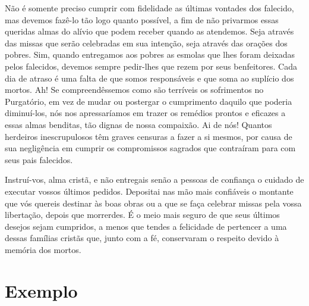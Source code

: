 Não é somente preciso cumprir com fidelidade as últimas vontades dos falecido, mas devemos fazê-lo tão logo quanto possível, a fim de não privarmos essas queridas almas do alívio que podem receber quando as atendemos. Seja através das missas que serão celebradas em sua intenção, seja através das orações dos pobres. Sim, quando entregamos aos pobres as esmolas que lhes foram deixadas pelos falecidos, devemos sempre pedir-lhes que rezem por seus benfeitores. Cada dia de atraso é uma falta de que somos responsáveis e que soma ao suplício dos mortos. Ah! Se compreendêssemos como são terríveis os sofrimentos no Purgatório, em vez de mudar ou postergar o cumprimento daquilo que poderia diminuí-los, nós nos apressaríamos em trazer os remédios prontos e eficazes a essas almas benditas, tão dignas de nossa compaixão. Ai de nós! Quantos herdeiros inescrupulosos têm graves censuras a fazer a si mesmos, por causa de sua negligência em cumprir os compromissos sagrados que contraíram para com seus pais falecidos. 

Instruí-vos, alma cristã, e não entregais senão a pessoas de confiança o cuidado de executar vossos últimos pedidos. Depositai nas mão mais confiáveis o montante que vós quereis destinar às boas obras ou a que se faça celebrar missas pela vossa libertação, depois que morrerdes. É o meio mais seguro de que seus últimos desejos sejam cumpridos, a menos que tendes a felicidade de pertencer a uma dessas famílias cristãs que, junto com a fé, conservaram o respeito devido à memória dos mortos.


\section*{Exemplo}

